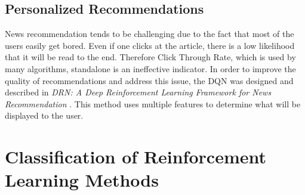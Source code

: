 \subsection{Personalized Recommendations}
\label{sub:intro-personalized-reccomendations}
News recommendation tends to be challenging due to the fact that most of the users easily get bored. Even if one clicks at the article, there is a low likelihood that it will be read to the end. Therefore Click Through Rate, which is used by many algorithms, standalone is an ineffective indicator. In order to improve the quality of recommendations and address this issue, the DQN was designed and described in \emph{DRN: A Deep Reinforcement Learning Framework for News Recommendation} \cite{DRNNewsRecommendaiton}. This method uses multiple features to determine what will be displayed to the user.

\section{Classification of Reinforcement Learning Methods}
\label{sec:classification-of-reinforcement-learning-methods}



